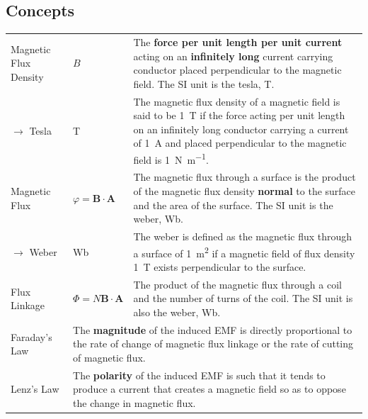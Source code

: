 \documentclass[a4paper,11pt]{article}
\begin{document}
	\subsection{Concepts}
	\begin{center}
		\renewcommand{\arraystretch}{1.2}
		\begin{tabular}{@{} l l p{8.6cm} @{}}
			\toprule
			Magnetic Flux Density & $B$ & The \textbf{force per unit length per unit current} acting on an \textbf{infinitely long} current carrying conductor placed perpendicular to the magnetic field. The SI unit is the tesla, \si{\tesla}. \\
			$\rightarrow$ Tesla & \si{\tesla} & The magnetic flux density of a magnetic field is said to be \SI{1}{\tesla} if the force acting per unit length on an infinitely long conductor carrying a current of \SI{1}{\ampere} and placed perpendicular to the magnetic field is \SI{1}{\newton\per\meter}. \\
			Magnetic Flux & $\varphi=\textbf{B}\cdot\textbf{A}$ & The magnetic flux through a surface is the product of the magnetic flux density \textbf{normal} to the surface and the area of the surface. The SI unit is the weber, \si{\weber}. \\
			$\rightarrow$ Weber & \si{\weber} & The weber is defined as the magnetic flux through a surface of \SI{1}{\meter\squared} if a magnetic field of flux density \SI{1}{\tesla} exists perpendicular to the surface.\\
			Flux Linkage & $\Phi=N\textbf{B}\cdot\textbf{A}$ & The product of the magnetic flux through a coil and the number of turns of the coil. The SI unit is also the weber, \si{\weber}. \\
			\midrule
			Faraday's Law & \multicolumn{2}{p{11.1cm}}{The \textbf{magnitude} of the induced EMF is directly proportional to the rate of change of magnetic flux linkage or the rate of cutting of magnetic flux.}\\
			Lenz's Law & \multicolumn{2}{p{11.1cm}}{The \textbf{polarity} of the induced EMF is such that it tends to produce a current that creates a magnetic field so as to oppose the change in magnetic flux. } \\
			\bottomrule
		\end{tabular}
	\end{center}
\end{document}

